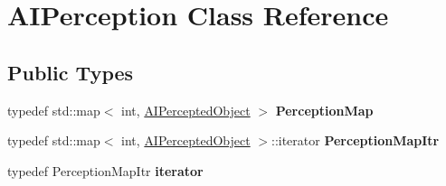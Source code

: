 \hypertarget{classAIPerception}{
\section{\-A\-I\-Perception \-Class \-Reference}
\label{d4/d0b/classAIPerception}
}
\subsection*{\-Public \-Types}
\begin{DoxyCompactItemize}
\item 
\hypertarget{classAIPerception_a6141c8fe30127ed32230c1af66b57399}{
typedef std\-::map$<$ int, \*
\hyperlink{classAIPerceptedObject}{\-A\-I\-Percepted\-Object} $>$ {\bfseries \-Perception\-Map}}
\label{d4/d0b/classAIPerception_a6141c8fe30127ed32230c1af66b57399}

\item 
\hypertarget{classAIPerception_ac3fac80d3bd76bf161d2ce3e92dfcd39}{
typedef std\-::map$<$ int, \*
\hyperlink{classAIPerceptedObject}{\-A\-I\-Percepted\-Object} $>$\-::iterator {\bfseries \-Perception\-Map\-Itr}}
\label{d4/d0b/classAIPerception_ac3fac80d3bd76bf161d2ce3e92dfcd39}

\item 
\hypertarget{classAIPerception_a3e39dd20b82f383d9925a286e4846489}{
typedef \-Perception\-Map\-Itr {\bfseries iterator}}
\label{d4/d0b/classAIPerception_a3e39dd20b82f383d9925a286e4846489}

\end{DoxyCompactItemize}
